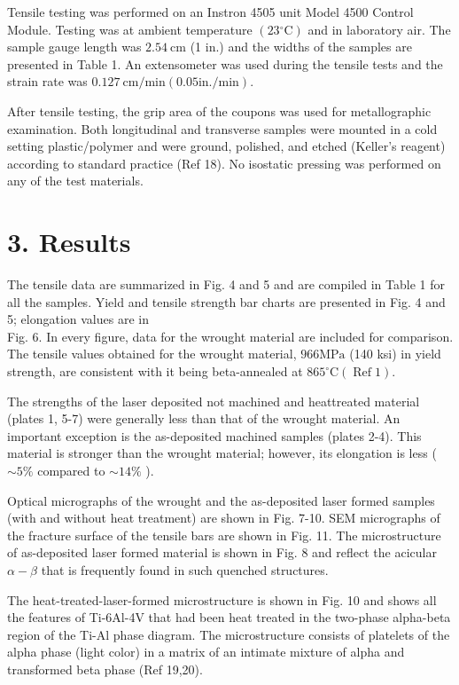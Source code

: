 \documentclass[10pt]{article}
\begin{document}
Tensile testing was performed on an Instron 4505 unit Model 4500 Control Module. Testing was at ambient temperature $\left(23{ }^{\circ} \mathrm{C}\right)$ and in laboratory air. The sample gauge length was $2.54 \mathrm{~cm}$ (1 in.) and the widths of the samples are presented in Table 1. An extensometer was used during the tensile tests and the strain rate was $0.127 \mathrm{~cm} / \mathrm{min}(0.05 \mathrm{in} . / \mathrm{min})$.

After tensile testing, the grip area of the coupons was used for metallographic examination. Both longitudinal and transverse samples were mounted in a cold setting plastic/polymer and were ground, polished, and etched (Keller's reagent) according to standard practice (Ref 18). No isostatic pressing was performed on any of the test materials.

\section*{3. Results}
The tensile data are summarized in Fig. 4 and 5 and are compiled in Table 1 for all the samples. Yield and tensile strength bar charts are presented in Fig. 4 and 5; elongation values are in\\
Fig. 6. In every figure, data for the wrought material are included for comparison. The tensile values obtained for the wrought material, $966 \mathrm{MPa}$ (140 ksi) in yield strength, are consistent with it being beta-annealed at $865^{\circ} \mathrm{C}(\operatorname{Ref} 1)$.

The strengths of the laser deposited not machined and heattreated material (plates 1, 5-7) were generally less than that of the wrought material. An important exception is the as-deposited machined samples (plates 2-4). This material is stronger than the wrought material; however, its elongation is less ( $\sim 5 \%$ compared to $\sim 14 \%$ ).

Optical micrographs of the wrought and the as-deposited laser formed samples (with and without heat treatment) are shown in Fig. 7-10. SEM micrographs of the fracture surface of the tensile bars are shown in Fig. 11. The microstructure of as-deposited laser formed material is shown in Fig. 8 and reflect the acicular $\alpha-\beta$ that is frequently found in such quenched structures.

The heat-treated-laser-formed microstructure is shown in Fig. 10 and shows all the features of Ti-6Al-4V that had been heat treated in the two-phase alpha-beta region of the Ti-Al phase diagram. The microstructure consists of platelets of the alpha phase (light color) in a matrix of an intimate mixture of alpha and transformed beta phase (Ref 19,20).
\end{document}
